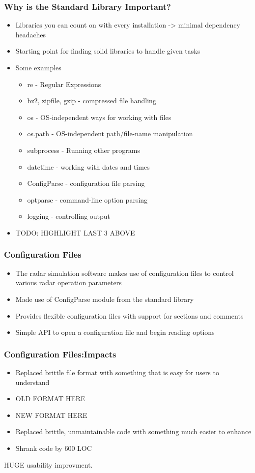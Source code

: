\documentclass[red, hyperref={pdfpagelabels=false}]{beamer}
\begin{document}
\begin{frame}
  \frametitle{Why is the Standard Library Important?}
  \begin{itemize}
    \item Libraries you can count on with every installation -> minimal dependency headaches
    \item Starting point for finding solid libraries to handle given tasks
    \item Some examples
      \begin{itemize}
        \item re - Regular Expressions
        \item bz2, zipfile, gzip - compressed file handling
        \item os - OS-independent ways for working with files
        \item os.path - OS-independent path/file-name manipulation
        \item subprocess - Running other programs
        \item datetime - working with dates and times
        \item ConfigParse - configuration file parsing
        \item optparse - command-line option parsing
        \item logging - controlling output
      \end{itemize}
    \item TODO: HIGHLIGHT LAST 3 ABOVE
  \end{itemize}
\end{frame}

\begin{frame}
  \frametitle{Configuration Files}
  \begin{itemize}
    \item The radar simulation software makes use of configuration files to
      control various radar operation parameters
    \item Made use of ConfigParse module from the standard library
    \item Provides flexible configuration files with support for sections and comments
    \item Simple API to open a configuration file and begin reading options
  \end{itemize}
\end{frame}

\begin{frame}
  \frametitle{Configuration Files:Impacts}
  \begin{itemize}
    \item Replaced brittle file format with something that is easy for users to understand
    \item OLD FORMAT HERE
    \item NEW FORMAT HERE
    \item Replaced brittle, unmaintainable code with something much easier to enhance
    \item Shrank code by 600 LOC
  \end{itemize}
  HUGE usability improvment.
\end{frame}
\end{document}
